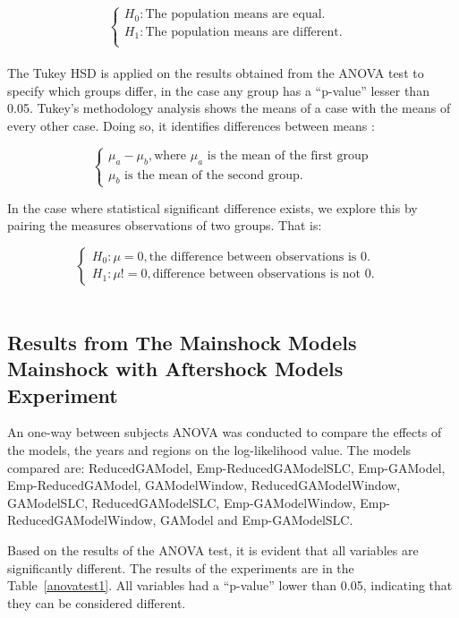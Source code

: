 $$\begin{cases} H_0: \text{The population means are equal.} &\\
H_1: \text{The population means are different.}&\\
\end{cases}$$\\

The Tukey HSD is applied on the results obtained from the ANOVA test to specify which groups differ, in the case any group has a ``p-value'' lesser than 0.05. Tukey's methodology analysis shows the means of a case with the means of every other case. Doing so, it identifies differences between means :

$$\begin{cases}
\mu_a-\mu_b, \text{where $\mu_a$ is the mean of the first group}\\
                \text{$\mu_b$ is the mean of the second group.}
\end{cases}$$

In the case where statistical significant difference exists, we explore this by pairing the measures observations of two groups. That is:

$$\begin{cases}
H_0: \mu = 0, \text{the difference between observations is 0.}&\\
H_1: \mu != 0, \text{difference between observations is not 0.}
\end{cases}$$\\


\subsection{Results from The Mainshock Models Mainshock with Aftershock Models Experiment}\label{resultsBigExp}

An one-way between subjects ANOVA was conducted to compare the effects of the models, the years and regions on the log-likelihood value. The models compared are: ReducedGAModel, Emp-ReducedGAModelSLC, Emp-GAModel, Emp-ReducedGAModel, GAModelWindow, ReducedGAModelWindow, GAModelSLC, ReducedGAModelSLC, Emp-GAModelWindow, Emp-ReducedGAModelWindow, GAModel and Emp-GAModelSLC.

Based on the results of the ANOVA test, it is evident that all variables are significantly different. The results of the experiments are in the Table~\ref{anovatest1}. All variables had a ``p-value'' lower than 0.05, indicating that they can be considered different.

